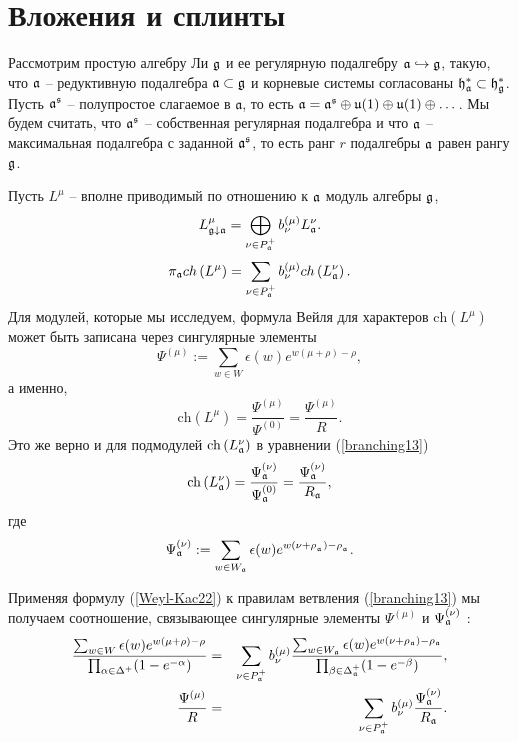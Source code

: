\section{Вложения и сплинты}

\label{sec:Injections and splints}

Рассмотрим простую алгебру Ли $\mathfrak{g}$ и ее  регулярную подалгебру $\mathfrak{a} \hookrightarrow \mathfrak{g}$, такую, что $\mathfrak{a}$ -- редуктивную подалгебра $\mathfrak{a}\subset \mathfrak{g}$ и корневые системы согласованы $\mathfrak{h}_{\mathfrak{a}}^{\ast}\subset\mathfrak{h}_{\mathfrak{g}}^{\ast}$. Пусть $\mathfrak{a}^{\mathfrak{s}}$ -- полупростое слагаемое в $\mathfrak{a}$, то есть  $\mathfrak{a}=\mathfrak{a}^{\mathfrak{s}} \oplus \mathfrak{u}(1)\oplus \mathfrak{u}(1)\oplus \dots$. Мы будем считать, что $\mathfrak{a}^{\mathfrak{s}}$ -- собственная регулярная подалгебра и что $\mathfrak{a}$ -- максимальная подалгебра с заданной  $\mathfrak{a}^{\mathfrak{s}}$, то есть ранг $r$ подалгебры $\mathfrak{a}$ равен рангу $\mathfrak{g}$.


Пусть $L^{\mu }$ -- вполне приводимый по отношению к  $\mathfrak{a}$ модуль алгебры $\mathfrak{g}$,
\[
L_{\gf\downarrow \af}^{\mu }=\bigoplus\limits_{\nu \in P_{\af%
}^{+}}b_{\nu }^{\left( \mu \right) }L_{\af}^{\nu }.
\]
\begin{equation}
\pi _{\af}ch\left( L^{\mu }\right) =\sum_{\nu \in P_{\af%
}^{+}}b_{\nu }^{(\mu )}ch\left( L_{\af}^{\nu }\right) .
\label{branching13}
\end{equation}
Для модулей, которые мы исследуем, формула Вейля для характеров $\mathrm{ch}\left(L^{\mu }\right) $ может быть записана через сингулярные элементы \cite{humphreys1997introduction}
\[
\Psi ^{\left( \mu \right) }:=\sum\limits_{w\in W}\epsilon (w)e^{w(\mu +\rho
)-\rho },
\]
а именно,
\begin{equation}
\mathrm{ch}\left( L^{\mu }\right) =\frac{\Psi ^{\left( \mu \right) }}{\Psi
^{\left( 0\right) }}=\frac{\Psi ^{\left( \mu \right) }}{R}.
\label{Weyl-Kac22}
\end{equation}
Это же верно и для подмодулей $\mathrm{ch}\left( L_{\mathfrak{a}}^{\nu}\right) $ в уравнении (\ref{branching13})
\[
\mathrm{ch}\left( L_{\af}^{\nu }\right) =\frac{\Psi _{\af}^{\left(
\nu \right) }}{\Psi _{\af}^{\left( 0\right) }}=\frac{\Psi _{\af%
}^{\left( \nu \right) }}{R_{\af}},
\]
где
\[
\Psi _{\af}^{\left( \nu \right) }:=\sum\limits_{w\in W_{\af%
}}\epsilon (w)e^{w(\nu +\rho _{_{\af}})-\rho _{_{\af}}}.
\]

Применяя формулу (\ref{Weyl-Kac22}) к правилам ветвления (\ref{branching13}) мы получаем соотношение, связывающее сингулярные элементы $\Psi ^{\left( \mu\right) }$ и $\Psi _{\mathfrak{a}}^{\left( \nu \right) }$ :
\begin{eqnarray}
\frac{\sum_{w \in W}\epsilon (w )e^{w (\mu +\rho )-\rho }}{\prod_{\alpha \in
\Delta ^{+}}(1-e^{-\alpha })} &=&\sum_{\nu \in P_{\af}^{+}}b_{\nu
}^{(\mu )}\frac{\sum_{w \in W_{\af}}\epsilon (w )e^{w (\nu +\rho _{%
\af})-\rho _{\af}}}{\prod_{\beta \in \Delta _{\af%
}^{+}}(1-e^{-\beta })},  \nonumber  \label{eq:132} \\
\frac{\Psi ^{\left( \mu \right) }}{R} &=&\sum_{\nu \in P_{\af%
}^{+}}b_{\nu }^{(\mu )}\frac{\Psi _{\af}^{\left( \nu \right) }}{R_{%
\af}}.  \label{singular main}
\end{eqnarray}

